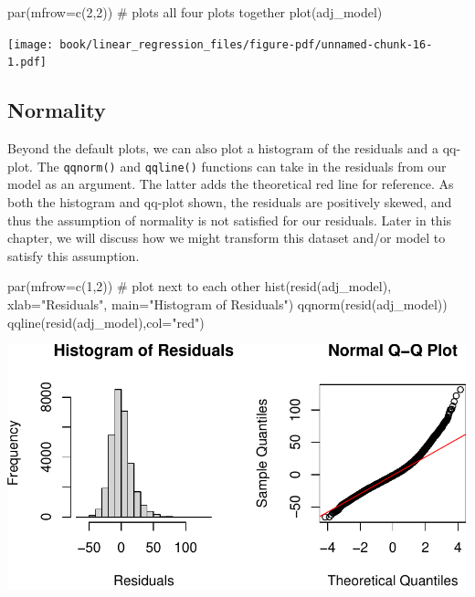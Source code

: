 \documentclass[
  letterpaper,
]{krantz}
\makeatletter
\newenvironment{Shaded}{\begin{snugshade}}{\end{snugshade}}
\newcommand{\AttributeTok}[1]{\textcolor[rgb]{0.40,0.45,0.13}{#1}}
\newcommand{\CommentTok}[1]{\textcolor[rgb]{0.37,0.37,0.37}{#1}}
\newcommand{\DecValTok}[1]{\textcolor[rgb]{0.68,0.00,0.00}{#1}}
\newcommand{\FunctionTok}[1]{\textcolor[rgb]{0.28,0.35,0.67}{#1}}
\newcommand{\NormalTok}[1]{\textcolor[rgb]{0.00,0.23,0.31}{#1}}
\newcommand{\StringTok}[1]{\textcolor[rgb]{0.13,0.47,0.30}{#1}}
\newenvironment{kframe}{%
\medskip{}
\setlength{\fboxsep}{.8em}
 \def\at@end@of@kframe{}%
 \ifinner\ifhmode%
  \def\at@end@of@kframe{\end{minipage}}%
  \begin{minipage}{\columnwidth}%
 \fi\fi%
 \def\FrameCommand##1{\hskip\@totalleftmargin \hskip-\fboxsep
 \colorbox{shadecolor}{##1}\hskip-\fboxsep
     \hskip-\linewidth \hskip-\@totalleftmargin \hskip\columnwidth}%
 \MakeFramed {\advance\hsize-\width
   \@totalleftmargin\z@ \linewidth\hsize
   \@setminipage}}%
 {\par\unskip\endMakeFramed%
 \at@end@of@kframe}
\renewenvironment{Shaded}{\begin{kframe}}{\end{kframe}}
\makeatother
\begin{document}
\begin{Shaded}
\begin{Highlighting}[]
\FunctionTok{par}\NormalTok{(}\AttributeTok{mfrow=}\FunctionTok{c}\NormalTok{(}\DecValTok{2}\NormalTok{,}\DecValTok{2}\NormalTok{)) }\CommentTok{\# plots all four plots together}
\FunctionTok{plot}\NormalTok{(adj\_model)}
\end{Highlighting}
\end{Shaded}

\begin{center}
\texttt{[image: book/linear\_regression\_files/figure-pdf/unnamed-chunk-16-1.pdf]}
\end{center}

\subsection{Normality}\label{normality}

Beyond the default plots, we can also plot a histogram of the residuals
and a qq-plot. The \texttt{qqnorm()} and \texttt{qqline()} functions can
take in the residuals from our model as an argument. The latter adds the
theoretical red line for reference. As both the histogram and qq-plot
shown, the residuals are positively skewed, and thus the assumption of
normality is not satisfied for our residuals. Later in this chapter, we
will discuss how we might transform this dataset and/or model to satisfy
this assumption.

\begin{Shaded}
\begin{Highlighting}[]
\FunctionTok{par}\NormalTok{(}\AttributeTok{mfrow=}\FunctionTok{c}\NormalTok{(}\DecValTok{1}\NormalTok{,}\DecValTok{2}\NormalTok{)) }\CommentTok{\# plot next to each other}
\FunctionTok{hist}\NormalTok{(}\FunctionTok{resid}\NormalTok{(adj\_model), }\AttributeTok{xlab=}\StringTok{"Residuals"}\NormalTok{, }
     \AttributeTok{main=}\StringTok{"Histogram of Residuals"}\NormalTok{) }
\FunctionTok{qqnorm}\NormalTok{(}\FunctionTok{resid}\NormalTok{(adj\_model))}
\FunctionTok{qqline}\NormalTok{(}\FunctionTok{resid}\NormalTok{(adj\_model),}\AttributeTok{col=}\StringTok{"red"}\NormalTok{) }
\end{Highlighting}
\end{Shaded}

\begin{center}
\includegraphics[width=1\textwidth,height=\textheight]{book/linear_regression_files/figure-pdf/unnamed-chunk-17-1.pdf}
\end{center}
\end{document}

